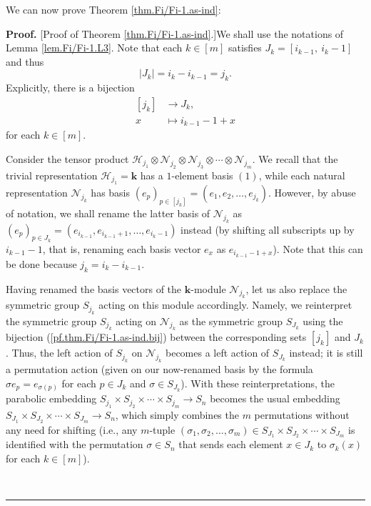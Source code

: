 \documentclass[numbers=enddot,12pt,final,onecolumn,notitlepage]{scrartcl}%
\theoremstyle{definition}
\newenvironment{proof}[1][Proof]{\noindent\textbf{#1.} }{\ \rule{0.5em}{0.5em}}
\begin{document}
We can now prove Theorem \ref{thm.Fi/Fi-1.as-ind}:

\begin{proof}
[Proof of Theorem \ref{thm.Fi/Fi-1.as-ind}.]We shall use the notations of
Lemma \ref{lem.Fi/Fi-1.L3}. Note that each $k\in\left[  m\right]  $ satisfies
$J_{k}=\left[  i_{k-1},\ i_{k}-1\right]  $ and thus
\begin{equation}
\left\vert J_{k}\right\vert =i_{k}-i_{k-1}=j_{k}.
\label{pf.thm.Fi/Fi-1.as-ind.jj}%
\end{equation}
Explicitly, there is a bijection%
\begin{align}
\left[  j_{k}\right]   &  \rightarrow J_{k},\nonumber\\
x  &  \mapsto i_{k-1}-1+x \label{pf.thm.Fi/Fi-1.as-ind.bij}%
\end{align}
for each $k\in\left[  m\right]  $.

Consider the tensor product $\mathcal{H}_{j_{1}}\otimes\mathcal{N}_{j_{2}%
}\otimes\mathcal{N}_{j_{3}}\otimes\cdots\otimes\mathcal{N}_{j_{m}}$. We recall
that the trivial representation $\mathcal{H}_{j_{1}}=\mathbf{k}$ has a
$1$-element basis $\left(  1\right)  $, while each natural representation
$\mathcal{N}_{j_{k}}$ has basis $\left(  e_{p}\right)  _{p\in\left[
j_{k}\right]  }=\left(  e_{1},e_{2},\ldots,e_{j_{k}}\right)  $. However, by
abuse of notation, we shall rename the latter basis of $\mathcal{N}_{j_{k}}$
as $\left(  e_{p}\right)  _{p\in J_{k}}=\left(  e_{i_{k-1}},e_{i_{k-1}%
+1},\ldots,e_{i_{k}-1}\right)  $ instead (by shifting all subscripts up by
$i_{k-1}-1$, that is, renaming each basis vector $e_{x}$ as $e_{i_{k-1}-1+x}%
$). Note that this can be done because $j_{k}=i_{k}-i_{k-1}$.

Having renamed the basis vectors of the $\mathbf{k}$-module $\mathcal{N}%
_{j_{k}}$, let us also replace the symmetric group $S_{j_{k}}$ acting on this
module accordingly. Namely, we reinterpret the symmetric group $S_{j_{k}}$
acting on $\mathcal{N}_{j_{k}}$ as the symmetric group $S_{J_{k}}$ using the
bijection (\ref{pf.thm.Fi/Fi-1.as-ind.bij}) between the corresponding sets
$\left[  j_{k}\right]  $ and $J_{k}$. Thus, the left action of $S_{j_{k}}$ on
$\mathcal{N}_{j_{k}}$ becomes a left action of $S_{J_{k}}$ instead; it is
still a permutation action (given on our now-renamed basis by the formula
$\sigma e_{p}=e_{\sigma\left(  p\right)  }$ for each $p\in J_{k}$ and
$\sigma\in S_{J_{k}}$). With these reinterpretations, the parabolic embedding
$S_{j_{1}}\times S_{j_{2}}\times\cdots\times S_{j_{m}}\rightarrow S_{n}$
becomes the usual embedding $S_{J_{1}}\times S_{J_{2}}\times\cdots\times
S_{J_{m}}\rightarrow S_{n}$, which simply combines the $m$ permutations
without any need for shifting (i.e., any $m$-tuple $\left(  \sigma_{1}%
,\sigma_{2},\ldots,\sigma_{m}\right)  \in S_{J_{1}}\times S_{J_{2}}%
\times\cdots\times S_{J_{m}}$ is identified with the permutation $\sigma\in
S_{n}$ that sends each element $x\in J_{k}$ to $\sigma_{k}\left(  x\right)  $
for each $k\in\left[  m\right]  $).


\end{proof}
\end{document}
